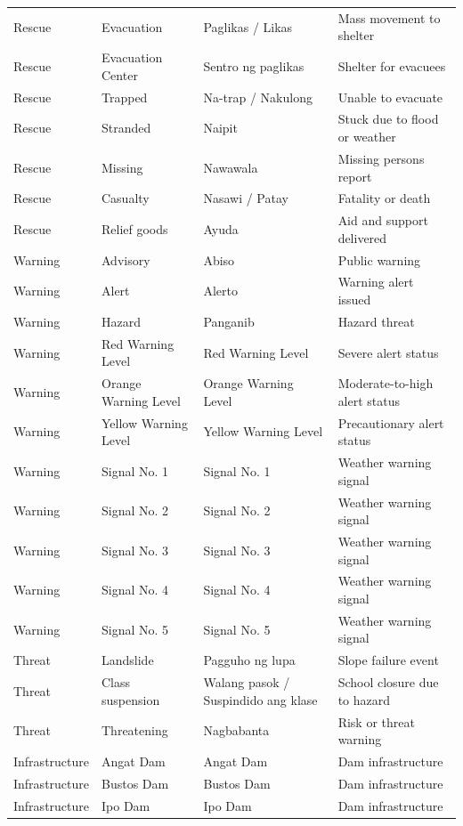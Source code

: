 \begin{longtable}{@{}p{} p{} p{} p{}@{}}
	Rescue & Evacuation & Paglikas / Likas & Mass movement to shelter \\
	Rescue & Evacuation Center & Sentro ng paglikas & Shelter for evacuees \\
	Rescue & Trapped & Na-trap / Nakulong & Unable to evacuate \\
	Rescue & Stranded & Naipit & Stuck due to flood or weather \\
	Rescue & Missing & Nawawala & Missing persons report \\
	Rescue & Casualty & Nasawi / Patay & Fatality or death \\
	Rescue & Relief goods & Ayuda & Aid and support delivered \\
	Warning & Advisory & Abiso & Public warning \\
	Warning & Alert & Alerto & Warning alert issued \\
	Warning & Hazard & Panganib & Hazard threat \\
	Warning & Red Warning Level & Red Warning Level & Severe alert status \\
	Warning & Orange Warning Level & Orange Warning Level & Moderate-to-high alert status \\
	Warning & Yellow Warning Level & Yellow Warning Level & Precautionary alert status \\
	Warning & Signal No. 1 & Signal No. 1 & Weather warning signal \\
	Warning & Signal No. 2 & Signal No. 2 & Weather warning signal \\
	Warning & Signal No. 3 & Signal No. 3 & Weather warning signal \\
	Warning & Signal No. 4 & Signal No. 4 & Weather warning signal \\
	Warning & Signal No. 5 & Signal No. 5 & Weather warning signal \\
	Threat & Landslide & Pagguho ng lupa & Slope failure event \\
	Threat & Class suspension & Walang pasok / Suspindido ang klase & School closure due to hazard \\
	Threat & Threatening & Nagbabanta & Risk or threat warning \\
	Infrastructure & Angat Dam & Angat Dam & Dam infrastructure \\
	Infrastructure & Bustos Dam & Bustos Dam & Dam infrastructure \\
	Infrastructure & Ipo Dam & Ipo Dam & Dam infrastructure \\
\end{longtable}

